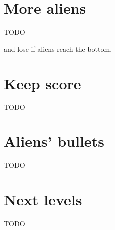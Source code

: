 \documentclass{article}
\begin{document}
\section{More aliens}

TODO

and lose if aliens reach the bottom.

\section{Keep score}

TODO

\section{Aliens' bullets}

TODO

\section{Next levels}

TODO
\end{document}
